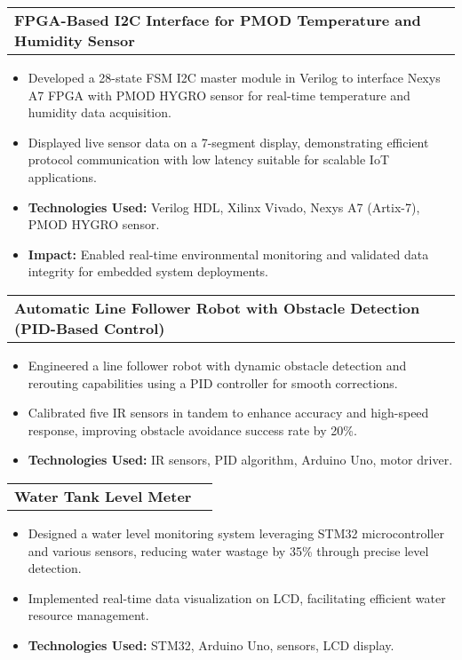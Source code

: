 \documentclass[a4paper]{article}
\begin{document}
\vspace{0.4em}
\begin{tabularx}{\textwidth}{@{}X r@{}}
    \textbf{FPGA-Based I2C Interface for PMOD Temperature and Humidity Sensor} & \\
\end{tabularx}
\vspace{-0.2em}
\begin{itemize}
    \item Developed a 28-state FSM I2C master module in Verilog to interface Nexys A7 FPGA with PMOD HYGRO sensor for real-time temperature and humidity data acquisition.
    \item Displayed live sensor data on a 7-segment display, demonstrating efficient protocol communication with low latency suitable for scalable IoT applications.
    \item \textbf{Technologies Used:} Verilog HDL, Xilinx Vivado, Nexys A7 (Artix-7), PMOD HYGRO sensor.
    \item \textbf{Impact:} Enabled real-time environmental monitoring and validated data integrity for embedded system deployments.
\end{itemize}

\vspace{0.4em}
\begin{tabularx}{\textwidth}{@{}X r@{}}
    \textbf{Automatic Line Follower Robot with Obstacle Detection (PID-Based Control)} & \\
\end{tabularx}
\vspace{-0.2em}
\begin{itemize}
    \item Engineered a line follower robot with dynamic obstacle detection and rerouting capabilities using a PID controller for smooth corrections.
    \item Calibrated five IR sensors in tandem to enhance accuracy and high-speed response, improving obstacle avoidance success rate by 20\%.
    \item \textbf{Technologies Used:} IR sensors, PID algorithm, Arduino Uno, motor driver.
\end{itemize}

\vspace{0.4em}
\begin{tabularx}{\textwidth}{@{}X r@{}}
    \textbf{Water Tank Level Meter} & \\
\end{tabularx}
\vspace{-0.2em}
\begin{itemize}
    \item Designed a water level monitoring system leveraging STM32 microcontroller and various sensors, reducing water wastage by 35\% through precise level detection.
    \item Implemented real-time data visualization on LCD, facilitating efficient water resource management.
    \item \textbf{Technologies Used:} STM32, Arduino Uno, sensors, LCD display.
\end{itemize}
\end{document}
